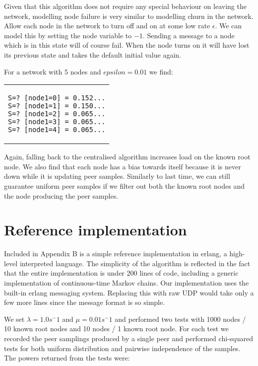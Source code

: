 \documentclass[a4paper,10pt]{article}
\newcommand{\code}[1]{
  \footnotesize
  
}
\newcommand{\prismmodel}[1]{
  \begin{quotation}
  \code{../models/#1.sm}
  \end{quotation}
}
\newenvironment{prismprop}[0]{
  \begin{center}
  \begin{tabular}{c}
  \footnotesize
}{
  \end{tabular}
  \end{center}
}
\begin{document}
Given that this algorithm does not require any special behaviour on leaving the network, modelling node failure is very similar to modelling churn in the network. Allow each node in the network to turn off and on at some low rate $\epsilon$. We can model this by setting the node variable to $-1$. Sending a message to a node which is in this state will of course fail. When the node turns on it will have lost its previous state and takes the default initial value again.

\prismmodel{ctmc_full_churn}

For a network with 5 nodes and $epsilon=0.01$ we find:

\begin{prismprop}
\begin{lstlisting}
S=? [node1=0] = 0.152...
S=? [node1=1] = 0.150...
S=? [node1=2] = 0.065...
S=? [node1=3] = 0.065...
S=? [node1=4] = 0.065...
\end{lstlisting}
\end{prismprop}

Again, falling back to the centralised algorithm increases load on the known root node. We also find that each node has a bias towards itself because it is never down while it is updating peer samples. Similarly to last time, we can still guarantee uniform peer samples if we filter out both the known root nodes and the node producing the peer samples.

\section{Reference implementation}

Included in Appendix B is a simple reference implementation in erlang, a high-level interpreted language. The simplicity of the algorithm is reflected in the fact that the entire implementation is under 200 lines of code, including a generic implementation of continuous-time Markov chains. Our implementation uses the built-in erlang messaging system. Replacing this with raw UDP would take only a few more lines since the message format is so simple. 

We set $\lambda=1.0 s^-1$ and $\mu=0.01 s^-1$ and performed two tests with 1000 nodes / 10 known root nodes and 10 nodes / 1 known root node. For each test we recorded the peer samplings produced by a single peer and performed chi-squared tests for both uniform distribution and pairwise independence of the samples. The powers returned from the tests were:
\end{document}
